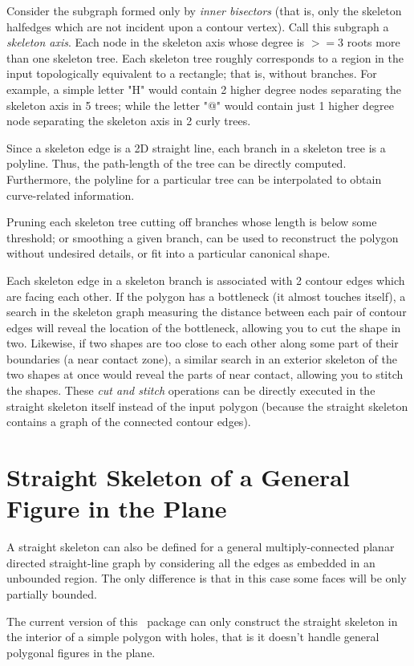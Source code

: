 Consider the subgraph formed only by \textit{inner bisectors} (that is, only the skeleton halfedges which are not incident upon a contour vertex). Call this subgraph a {\em skeleton axis}.
Each node in the skeleton axis whose degree is $>=3$ roots more than one skeleton tree. Each skeleton tree roughly corresponds to a region in the input topologically equivalent to a rectangle; that is, without branches. For example, a simple letter "H" would contain 2 higher degree nodes separating the skeleton axis in 5 trees; while the letter "@" would contain just 1 higher degree node separating the skeleton axis in 2 curly trees. 

Since a skeleton edge is a 2D straight line, each branch in a skeleton tree is a polyline. Thus, the path-length of the tree can be directly computed. Furthermore, the polyline for a particular tree can be interpolated to obtain curve-related information.

Pruning each skeleton tree cutting off branches whose length is below some threshold; or smoothing a given branch, can be used to reconstruct the polygon without undesired details, or fit into a particular canonical shape.

Each skeleton edge in a skeleton branch is associated with 2 contour edges which are facing each other. If the polygon has a bottleneck (it almost touches itself), a search in the skeleton graph measuring the distance between each pair of contour edges will reveal the location of the bottleneck, allowing you to cut the shape in two. Likewise, if two shapes are too close to each other along some part of their boundaries (a near contact zone), a similar search in an exterior skeleton of the two shapes at once would reveal the parts of near contact, allowing you to stitch the shapes. These \textit{cut and stitch} operations can be directly executed in the straight skeleton itself instead of the input polygon (because the straight skeleton contains a graph of the connected contour edges).


\section{Straight Skeleton of a General Figure in the Plane}

A straight skeleton can also be defined for a general
multiply-connected planar directed straight-line graph \cite{aa-skfgpf-95} by considering
all the edges as embedded in an unbounded region. The only difference
is that in this case some faces will be only partially bounded.


The current version of this \cgal\ package can only construct the
straight skeleton in the interior of a simple polygon with holes, that is it
doesn't handle general polygonal figures in the plane.



